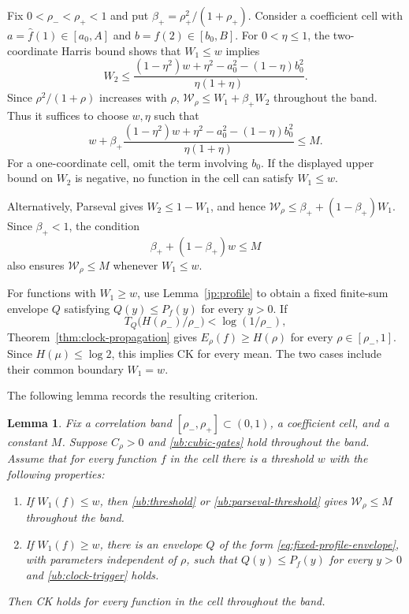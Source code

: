 \documentclass[11pt,letterpaper]{amsart}
\newcommand{\1}{\mathbf 1}
\newtheorem{lemma}[theorem]{Lemma}
\numberwithin{equation}{section}
\begin{document}
Fix $0<\rho_-<\rho_+<1$ and put
$\beta_+=\rho_+^2/(1+\rho_+)$.
Consider a coefficient cell with
$a=\widehat f(1)\in[a_0,A]$ and
$b=\widehat f(2)\in[b_0,B]$.
For $0<\eta\le1$, the two-coordinate Harris bound shows that
$W_1\le w$ implies
\[
 W_2\le
 \frac{(1-\eta^2)w+\eta^2-a_0^2-(1-\eta)b_0^2}
      {\eta(1+\eta)}.
\]
Since $\rho^2/(1+\rho)$ increases with $\rho$,
$\mathcal W_\rho\le W_1+\beta_+W_2$ throughout the band.
Thus it suffices to choose $w,\eta$ such that
\begin{equation}\label{ub:threshold}
 w+\beta_+
 \frac{(1-\eta^2)w+\eta^2-a_0^2-(1-\eta)b_0^2}
      {\eta(1+\eta)}\le M.
\end{equation}
For a one-coordinate cell, omit the term involving $b_0$.
If the displayed upper bound on $W_2$ is negative, no function
in the cell can satisfy $W_1\le w$.

Alternatively, Parseval gives $W_2\le1-W_1$, and hence
$\mathcal W_\rho\le\beta_++(1-\beta_+)W_1$.
Since $\beta_+<1$, the condition
\begin{equation}\label{ub:parseval-threshold}
 \beta_++(1-\beta_+)w\le M
\end{equation}
also ensures $\mathcal W_\rho\le M$ whenever $W_1\le w$.

For functions with $W_1\ge w$, use Lemma~\ref{jp:profile}
to obtain a fixed finite-sum envelope $Q$ satisfying
$Q(y)\le P_f(y)$ for every $y>0$.
If
\begin{equation}\label{ub:clock-trigger}
 T_Q\bigl(H(\rho_-)/\rho_-\bigr)<\log(1/\rho_-),
\end{equation}
Theorem~\ref{thm:clock-propagation} gives
$E_\rho(f)\ge H(\rho)$ for every $\rho\in[\rho_-,1]$.
Since $H(\mu)\le\log2$, this implies CK for every mean.
The two cases include their common boundary $W_1=w$.

The following lemma records the resulting criterion.

\begin{lemma}\label{ub:cell-dichotomy}
Fix a correlation band $[\rho_-,\rho_+]\subset(0,1)$,
a coefficient cell, and a constant $M$.
Suppose $C_\rho>0$ and \eqref{ub:cubic-gates} hold throughout
the band.
Assume that for every function $f$ in the cell there is a
threshold $w$ with the following properties:
\begin{enumerate}[label=(\alph*)]
 \item If $W_1(f)\le w$, then \eqref{ub:threshold} or
       \eqref{ub:parseval-threshold} gives
       $\mathcal W_\rho\le M$ throughout the band.
 \item If $W_1(f)\ge w$, there is an envelope $Q$ of the form
       \eqref{eq:fixed-profile-envelope}, with parameters
       independent of $\rho$, such that
       $Q(y)\le P_f(y)$ for every $y>0$ and
       \eqref{ub:clock-trigger} holds.
\end{enumerate}
Then CK holds for every function in the cell throughout the band.
\end{lemma}
\end{document}
